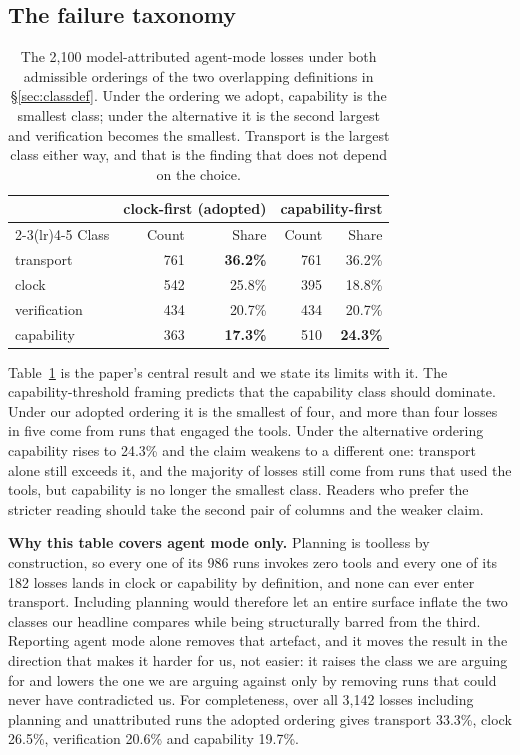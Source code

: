 \documentclass[11pt]{article}
\begin{document}
\subsection{The failure taxonomy}

\begin{table}[htbp]
\centering\small
\begin{tabular}{@{}lrrrr@{}}
\toprule
& \multicolumn{2}{c}{clock-first (adopted)} & \multicolumn{2}{c}{capability-first} \\
\cmidrule(lr){2-3}\cmidrule(lr){4-5}
Class & Count & Share & Count & Share \\
\midrule
transport & 761 & \textbf{36.2\%} & 761 & 36.2\% \\
clock & 542 & 25.8\% & 395 & 18.8\% \\
verification & 434 & 20.7\% & 434 & 20.7\% \\
capability & 363 & \textbf{17.3\%} & 510 & \textbf{24.3\%} \\
\bottomrule
\end{tabular}
\caption{The 2{,}100 model-attributed agent-mode losses under both admissible orderings of the two overlapping
definitions in \S\ref{sec:classdef}. Under the ordering we adopt, capability is the smallest class; under the
alternative it is the second largest and verification becomes the smallest. Transport is the largest class
either way, and that is the finding that does not depend on the choice.}
\label{tab:taxonomy}
\end{table}

Table~\ref{tab:taxonomy} is the paper's central result and we state its limits with it. The capability-threshold
framing predicts that the capability class should dominate. Under our adopted ordering it is the smallest of
four, and more than four losses in five come from runs that engaged the tools. Under the alternative ordering
capability rises to 24.3\% and the claim weakens to a different one: transport alone still exceeds it, and the
majority of losses still come from runs that used the tools, but capability is no longer the smallest class.
Readers who prefer the stricter reading should take the second pair of columns and the weaker claim.

\textbf{Why this table covers agent mode only.} Planning is toolless by construction, so every one of its 986
runs invokes zero tools and every one of its 182 losses lands in clock or capability by definition, and none can
ever enter transport. Including planning would therefore let an entire surface inflate the two classes our
headline compares while being structurally barred from the third. Reporting agent mode alone removes that
artefact, and it moves the result in the direction that makes it harder for us, not easier: it raises the class
we are arguing for and lowers the one we are arguing against only by removing runs that could never have
contradicted us. For completeness, over all 3{,}142 losses including planning and unattributed runs the adopted
ordering gives transport 33.3\%, clock 26.5\%, verification 20.6\% and capability 19.7\%.
\end{document}
